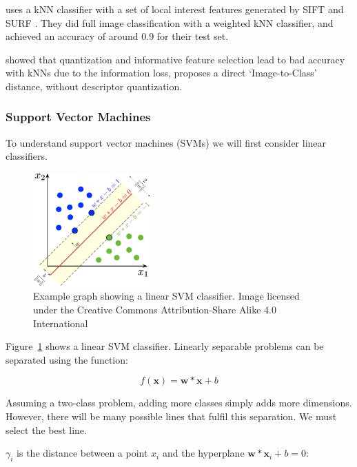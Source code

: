 \documentclass{article}
\begin{document}
\begin{multicols}{2}
\cite{amato} uses a kNN classifier with a set of local interest features generated by SIFT \cite{sift} and SURF \citep{surf}. They did full image classification with a weighted kNN classifier, and achieved an accuracy of around 0.9 for their test set.

\cite{boiman} showed that quantization and informative feature selection lead to bad accuracy with kNNs due to the information loss, proposes a direct `Image-to-Class' distance, without descriptor quantization.

\subsubsection{Support Vector Machines}
To understand support vector machines (SVMs) \cite{vapnik} we will first consider linear classifiers. 

\begin{figure}[H]
	\begin{center}
		\includegraphics[width=0.4\textwidth]{SVM_margin.png}
	\end{center}
	\caption{Example graph showing a linear SVM classifier. 
	Image licensed under the Creative Commons Attribution-Share Alike 4.0 International \cite{larhmam}}
    \label{fig:svm}
\end{figure}

Figure~\ref{fig:svm} shows a linear SVM classifier. Linearly separable problems can be separated using the function:

\begin{equation}
	f(\textbf{x}) = \textbf{w} * \textbf{x} + b
\end{equation}

Assuming a two-class problem, adding more classes simply adds more dimensions. However, there will be many possible lines that fulfil this separation. We must select the best line. 

$\gamma_{i}$ is the distance between a point $x_i$ and the hyperplane $\textbf{w} * \textbf{x}_{i} + b = 0$:


\end{multicols}
\end{document}
